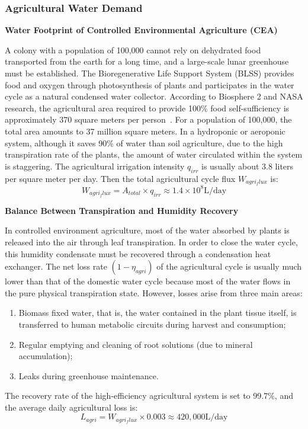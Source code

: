 \subsubsection{Agricultural Water Demand}
\medskip
\noindent\textbf{Water Footprint of Controlled Environmental Agriculture (CEA)}\par
A colony with a population of 100,000 cannot rely on dehydrated food transported from the earth for a long time, and a large-scale lunar greenhouse must be established.
The Bioregenerative Life Support System (BLSS) provides food and oxygen through photosynthesis of plants and participates in the water cycle as a natural condensed water collector.
According to Biosphere 2 and NASA research, the agricultural area required to provide 100\% food self-sufficiency is approximately 370 square meters per person~\cite{vpk_moon_water_2024}. For a population of 100,000, the total area amounts to 37 million square meters.
In a hydroponic or aeroponic system, although it saves 90\% of water than soil agriculture, due to the high transpiration rate of the plants, the amount of water circulated within the system is staggering.
The agricultural irrigation intensity $q_{irr}$ is usually about 3.8 liters per square meter per day. Then the total agricultural cycle flux $W_{agri_flux}$ is:
\[W_{agri_flux}=A_{total}\times q_{irr}\approx1.4\times10^8\mathrm{L/day}\]

\medskip
\noindent\textbf{Balance Between Transpiration and Humidity Recovery}\par
In controlled environment agriculture, most of the water absorbed by plants is released into the air through leaf transpiration.
In order to close the water cycle, this humidity condensate must be recovered through a condensation heat exchanger.
The net loss rate $(1 - \eta_{agri})$ of the agricultural cycle is usually much lower than that of the domestic water cycle because most of the water flows in the pure physical transpiration state.
However, losses arise from three main areas:
\begin{enumerate}
\item Biomass fixed water, that is, the water contained in the plant tissue itself, is transferred to human metabolic circuits during harvest and consumption;
\item Regular emptying and cleaning of root solutions (due to mineral accumulation);
\item Leaks during greenhouse maintenance.
\end{enumerate}
The recovery rate of the high-efficiency agricultural system is set to 99.7\%, and the average daily agricultural loss is:
\[L_{agri}=W_{agri_flux}\times0.003\approx420,000\mathrm{L/day}\]

